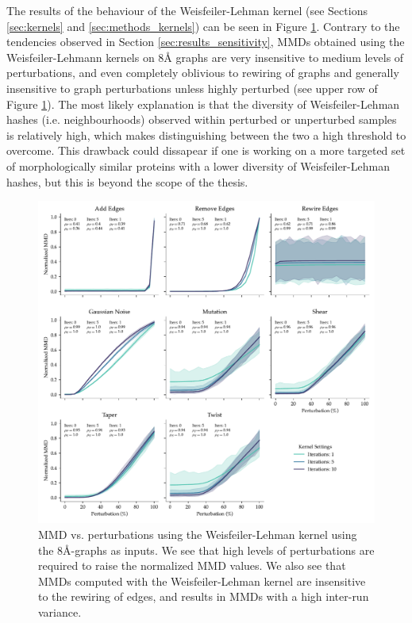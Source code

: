 The results of the behaviour of the Weisfeiler-Lehman kernel (see Sections
\ref{sec:kernels} and \ref{sec:methods_kernels}) can be seen in Figure
\ref{fig:wlk}. Contrary to the tendencies observed in Section
\ref{sec:results_sensitivity}, MMDs obtained using the Weisfeiler-Lehmann
kernels on 8\si{\angstrom} graphs are very insensitive to medium levels of perturbations,
and even completely oblivious to rewiring of graphs and generally insensitive to
graph perturbations unless highly perturbed (see upper row of Figure \ref{fig:wlk}). The most likely explanation
is that the diversity of Weisfeiler-Lehman hashes (i.e. neighbourhoods) observed within perturbed or
unperturbed samples is relatively high, which makes distinguishing between the
two a high threshold to overcome. This drawback could dissapear if one is working on
a more targeted set of morphologically similar proteins with a lower diversity
of Weisfeiler-Lehman hashes, but this is beyond the scope of the thesis.

\begin{figure}
  \includegraphics[width=\textwidth]{./figures/results/res_3.pdf}
  \caption[Normalized MMD values using the Weisfeiler-Lehman kernel subject to
  various perturbations.]{MMD vs.
perturbations using the Weisfeiler-Lehman kernel using the
8\si{\angstrom}-graphs as inputs. We see that high levels of perturbations are
required to raise the normalized MMD values. We also see that MMDs computed with
the Weisfeiler-Lehman kernel are insensitive to the rewiring of edges, and
results in MMDs with a high inter-run variance.}
  \label{fig:wlk}
\end{figure}

